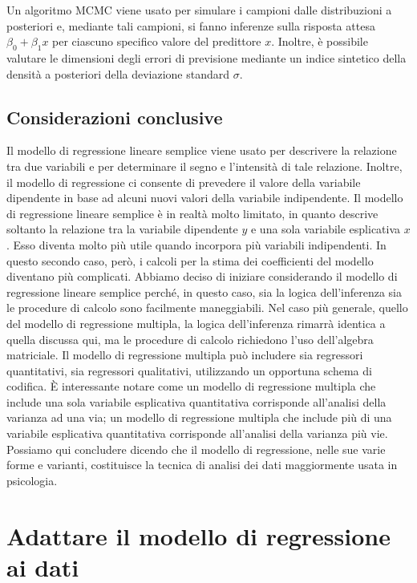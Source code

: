 \documentclass[
  10pt,
  italian,
  a4paper,
  extrafontsizes,onecolumn,openright
  ]{memoir}
\begin{document}
Un algoritmo MCMC viene usato per simulare i campioni dalle distribuzioni a posteriori e, mediante tali campioni, si fanno inferenze sulla risposta attesa \(\beta_0 + \beta_1 x\) per ciascuno specifico valore del predittore \(x\). Inoltre, è possibile valutare le dimensioni degli errori di previsione mediante un indice sintetico della densità a posteriori della deviazione standard \(\sigma\).

\hypertarget{considerazioni-conclusive}{%
\section*{Considerazioni conclusive}\label{considerazioni-conclusive}}

Il modello di regressione lineare semplice viene usato per descrivere la
relazione tra due variabili e per determinare il segno e l'intensità di
tale relazione. Inoltre, il modello di regressione ci consente di
prevedere il valore della variabile dipendente in base ad alcuni nuovi
valori della variabile indipendente. Il modello di regressione lineare
semplice è in realtà molto limitato, in quanto descrive soltanto la
relazione tra la variabile dipendente \(y\) e una sola variabile
esplicativa \(x\). Esso diventa molto più utile quando incorpora più
variabili indipendenti. In questo secondo caso, però, i calcoli per la
stima dei coefficienti del modello diventano più complicati. Abbiamo
deciso di iniziare considerando il modello di regressione lineare semplice
perché, in questo caso, sia la logica dell'inferenza sia le procedure di
calcolo sono facilmente maneggiabili. Nel caso più generale, quello del
modello di regressione multipla, la logica dell'inferenza rimarrà
identica a quella discussa qui, ma le procedure di calcolo richiedono
l'uso dell'algebra matriciale. Il modello di regressione multipla può includere sia regressori quantitativi, sia regressori qualitativi, utilizzando un
opportuna schema di codifica. È interessante notare come un modello di
regressione multipla che include una sola variabile esplicativa
quantitativa corrisponde all'analisi della varianza ad una via; un
modello di regressione multipla che include più di una variabile
esplicativa quantitativa corrisponde all'analisi della varianza più vie.
Possiamo qui concludere dicendo che il modello di regressione, nelle sue varie forme e varianti, costituisce la tecnica di analisi dei dati maggiormente usata in psicologia.

\hypertarget{regr-ml}{%
\chapter{Adattare il modello di regressione ai dati}\label{regr-ml}}
\end{document}
